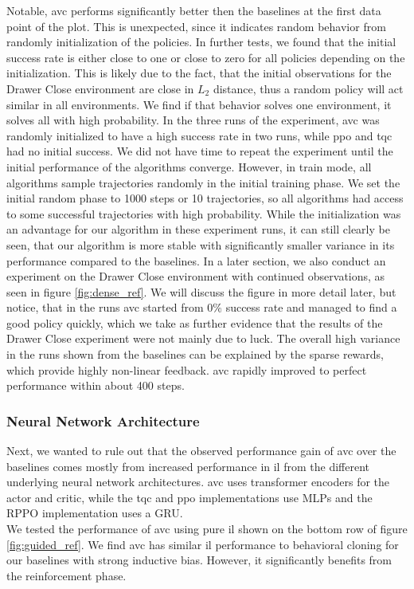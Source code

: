 Notable, \ac{avc} performs significantly better then the baselines at the first data point of the plot. This is unexpected, since it indicates 
random behavior from randomly initialization of the policies. In further tests, we found that the initial success rate is either close to one or close to zero for all policies depending 
on the initialization. This is likely 
due to the fact, that the initial observations for the Drawer Close environment are close in $L_2$ distance, thus a random policy will act similar in all environments. We find if that behavior 
solves one environment, it solves all with high probability. In the three runs of the experiment, \ac{avc} was randomly initialized to have a high success rate in two runs, while \ac{ppo} and \ac{tqc} had no 
initial success. We did not have time to repeat the experiment until the initial performance of the algorithms converge. However, in train mode, 
all algorithms sample trajectories randomly in the initial training phase. 
We set the initial random phase to 1000 steps or 10 trajectories, so all algorithms had access to some successful trajectories with high probability. While the initialization was an advantage 
for our algorithm in these experiment runs, it can still clearly be seen, that our algorithm is more stable with significantly smaller variance in its performance compared to the baselines. In a later 
section, we also conduct an experiment on the Drawer Close environment with continued observations, as seen in figure \ref{fig:dense_ref}. We will discuss the figure in more detail later, but 
notice, that in the runs \ac{avc} started from $0 \%$ success rate and managed to find a good policy quickly, which we take as further evidence that the results of the Drawer Close experiment were not 
mainly due to luck. The overall high variance in the runs shown from the baselines can be explained by the sparse rewards, which provide highly non-linear feedback. 
\ac{avc} rapidly improved to perfect performance within about 400 steps. \\

\subsubsection{Neural Network Architecture}
Next, we wanted to rule out that the observed performance gain of \ac{avc} over the baselines comes mostly from increased performance in \ac{il} 
from the different underlying neural network architectures. \ac{avc} uses transformer encoders for the actor and 
critic, while the \ac{tqc} and \ac{ppo} implementations use MLPs and the RPPO implementation uses a GRU.\\ 
We tested the performance of \ac{avc} using pure \ac{il} shown on the bottom row of
figure \ref{fig:guided_ref}. We find \ac{avc} has similar \ac{il} performance to behavioral cloning for our baselines with strong inductive bias. However, it significantly benefits from the reinforcement phase.\\

